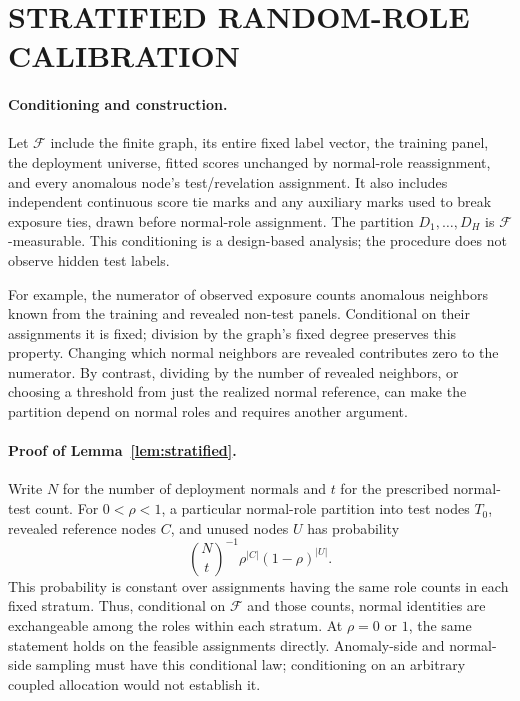 \section{STRATIFIED RANDOM-ROLE CALIBRATION}
\label{app:stratified}

\paragraph{Conditioning and construction.}
Let $\mathcal F$ include the finite graph, its entire fixed label vector, the training panel, the deployment universe, fitted scores unchanged by normal-role reassignment, and every anomalous node's test/revelation assignment. It also includes independent continuous score tie marks and any auxiliary marks used to break exposure ties, drawn before normal-role assignment. The partition $D_1,\ldots,D_H$ is $\mathcal F$-measurable. This conditioning is a design-based analysis; the procedure does not observe hidden test labels.

For example, the numerator of observed exposure counts anomalous neighbors known from the training and revealed non-test panels. Conditional on their assignments it is fixed; division by the graph's fixed degree preserves this property. Changing which normal neighbors are revealed contributes zero to the numerator. By contrast, dividing by the number of revealed neighbors, or choosing a threshold from just the realized normal reference, can make the partition depend on normal roles and requires another argument.

\paragraph{Proof of Lemma~\ref{lem:stratified}.}
Write $N$ for the number of deployment normals and $t$ for the prescribed normal-test count. For $0<\rho<1$, a particular normal-role partition into test nodes $T_0$, revealed reference nodes $C$, and unused nodes $U$ has probability
\[
\binom Nt^{-1}\rho^{|C|}(1-\rho)^{|U|}.
\]
This probability is constant over assignments having the same role counts in each fixed stratum. Thus, conditional on $\mathcal F$ and those counts, normal identities are exchangeable among the roles within each stratum. At $\rho=0$ or $1$, the same statement holds on the feasible assignments directly. Anomaly-side and normal-side sampling must have this conditional law; conditioning on an arbitrary coupled allocation would not establish it.

